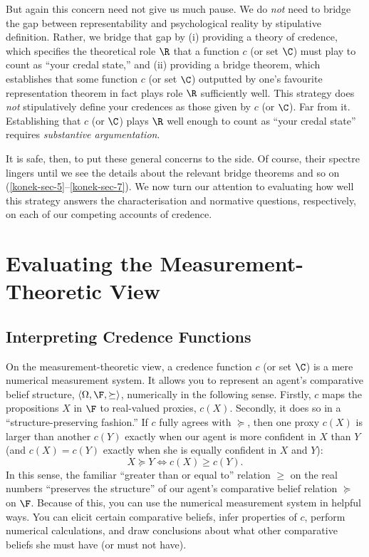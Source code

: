 But again this concern need not give us much pause. We do \textit{not} need to bridge the gap between representability and psychological reality by stipulative definition. Rather, we bridge that gap by (i) providing a theory of credence, which specifies the theoretical role $\R$ that a function $c$ (or set $\C$) must play to count as ``your credal state,'' and (ii) providing a bridge theorem, which establishes that some function $c$ (or set $\C$) outputted by one's favourite representation theorem in fact plays role $\R$ sufficiently well. This strategy does \textit{not} stipulatively define your credences as those given by $c$ (or $\C$). Far from it. Establishing that $c$ (or $\C$) plays $\R$ well enough to count as ``your credal state'' requires \textit{substantive argumentation}.

It is safe, then, to put these general concerns to the side. Of course, their spectre lingers until we see the details about the relevant bridge theorems and so on (\autoref{konek-sec-5}--\ref{konek-sec-7}). We now turn our attention to evaluating how well this strategy answers the characterisation and normative questions, respectively, on each of our competing accounts of credence.



\section{Evaluating the Measurement-Theoretic View}\label{konek-sec-5}


\subsection{Interpreting Credence Functions}

On the measurement-theoretic view, a credence function $c$ (or set $\C$) is a mere numerical measurement system. It allows you to represent an agent's comparative belief structure, $\left<\Omega,\F,\succeq\right>$, numerically in the following sense. Firstly, $c$ maps the propositions $X$ in $\F$ to real-valued proxies, $c(X)$. Secondly, it does so in a ``structure-preserving fashion.'' If $c$ fully agrees with $\succeq$, then one proxy $c(X)$ is larger than another $c(Y)$ exactly when our agent is more confident in $X$ than $Y$ (and $c(X)=c(Y)$ exactly when she is equally confident in $X$ and $Y$): 
$$ X\succeq Y \Leftrightarrow c(X)\geq c(Y). $$
In this sense, the familiar ``greater than or equal to'' relation $\geq$ on the real numbers ``preserves the structure'' of our agent's comparative belief relation $\succeq$ on $\F$. Because of this, you can use the numerical measurement system in helpful ways. You can elicit certain comparative beliefs, infer properties of $c$, perform numerical calculations, and draw conclusions about what other comparative beliefs she must have (or must not have).

